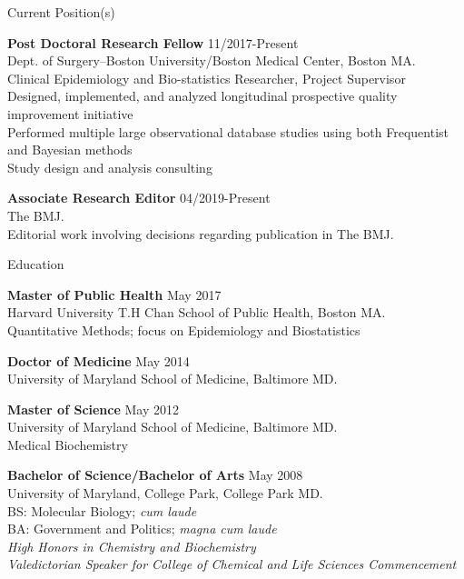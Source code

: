 \documentclass{resume} %
\begin{document}
\begin{rSection}{Current Position(s)}

{\bf Post Doctoral Research Fellow} \hfill {11/2017-Present}
\\ 
Dept. of Surgery--Boston University/Boston Medical Center, Boston MA. 
\\
Clinical Epidemiology and Bio-statistics Researcher, Project Supervisor
\\
Designed, implemented, and analyzed longitudinal prospective quality improvement initiative\\
Performed multiple large observational database studies using both Frequentist and Bayesian methods\\
Study design and analysis consulting

{\bf Associate Research Editor } \hfill {04/2019-Present}
\\ 
The BMJ. 
\\
Editorial work involving decisions regarding publication in The BMJ. 

\end{rSection}

\begin{rSection}{Education}

{\bf Master of Public Health} \hfill {May 2017}
\\ 
Harvard University T.H Chan School of Public Health, Boston MA. 
\\
Quantitative Methods; focus on Epidemiology and Biostatistics  

{\bf Doctor of Medicine} \hfill {May 2014}
\\ 
University of Maryland School of Medicine, Baltimore MD.

{\bf Master of Science} \hfill {May 2012}
\\ 
University of Maryland School of Medicine, Baltimore MD.
\\
Medical Biochemistry

{\bf Bachelor of Science/Bachelor of Arts} \hfill {May 2008}
\\ 
University of Maryland, College Park, College Park MD.
\\
BS: Molecular Biology; \textit{cum laude}\\
BA: Government and Politics; \textit{magna cum laude}\\
\textit{High Honors in Chemistry and Biochemistry}\\
\textit{Valedictorian Speaker for College of Chemical and Life Sciences Commencement}

\end{rSection}
\end{document}
